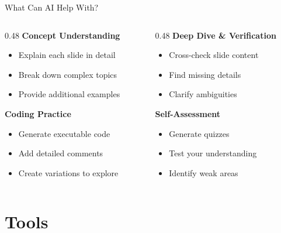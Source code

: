 \documentclass[aspectratio=169,xcolor=dvipsnames]{beamer}
\begin{document}
\begin{frame}{What Can AI Help With?}
  \begin{columns}[T]
    \begin{column}{0.48\textwidth}
      \textbf{Concept Understanding}
      \begin{itemize}
        \item Explain each slide in detail
        \item Break down complex topics
        \item Provide additional examples
      \end{itemize}

      \vspace{1em}
      \textbf{Coding Practice}
      \begin{itemize}
        \item Generate executable code
        \item Add detailed comments
        \item Create variations to explore
      \end{itemize}
    \end{column}
    \begin{column}{0.48\textwidth}
      \textbf{Deep Dive \& Verification}
      \begin{itemize}
        \item Cross-check slide content
        \item Find missing details
        \item Clarify ambiguities
      \end{itemize}

      \vspace{1em}
      \textbf{Self-Assessment}
      \begin{itemize}
        \item Generate quizzes
        \item Test your understanding
        \item Identify weak areas
      \end{itemize}
    \end{column}
  \end{columns}
\end{frame}

\section{Tools}
\end{document}
